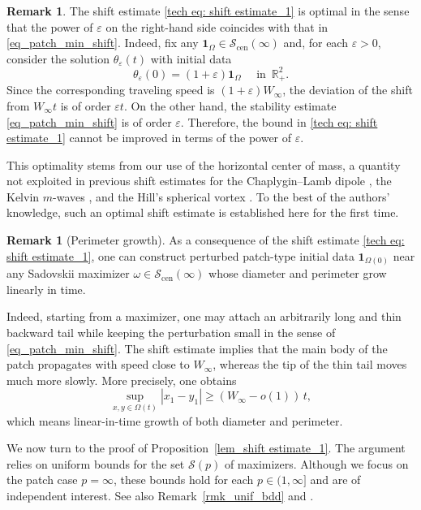 \documentclass[11pt]{amsart}
\theoremstyle{definition}
\theoremstyle{definition}
\newtheorem{remark}[theorem]{Remark}
\numberwithin{equation}{section}
\newcommand{\0}{\emptyset}
\newcommand{\veps}{\varepsilon}
\newcommand{\Omg}{\Omega}
\newcommand{\bbR}{\mathbb R}
\newcommand{\calS}{\mathcal S}
\newcommand{\bfone}{\mathbf1}
\newcommand{\ift}{\infty}
\begin{document}
			\begin{remark}\label{rmk: shift is optimal}
				The shift estimate \eqref{tech eq: shift estimate_1} is optimal in the sense that the power of $\veps$ on the right-hand side coincides with that in \eqref{eq_patch_min_shift}.
				Indeed, fix any $\bfone_\Omg\in\calS_{\mathrm{cen}}(\ift)$ and, for each $\veps>0$, consider the solution $\theta_\veps(t)$ with initial data 
				\[
				\theta_\veps(0)=(1+\veps)\bfone_\Omega \quad \textrm{ in }\, \bbR^2_+.
				\]
				Since the corresponding traveling speed is $(1+\veps)W_\ift$, the deviation of the shift from $W_{\infty}t$ is of order $\veps  t$.
				On the other hand, the stability estimate \eqref{eq_patch_min_shift} is of order $\varepsilon$.
				Therefore, the bound in \eqref{tech eq: shift estimate_1} cannot be improved in terms of the power of $\varepsilon$.
				
				This optimality stems from our use of the horizontal center of mass, a quantity not exploited in previous shift estimates for the Chaplygin--Lamb dipole \cite{CJ2022, JYZ}, the Kelvin $m$-waves \cite{CJ2022kelvin}, and the Hill's spherical vortex \cite{CJ2023}.
				To the best of the authors' knowledge, such an optimal shift estimate is established here for the first time. 
			\end{remark}
			
			\begin{remark}[Perimeter growth]\label{rmk: perimeter_growth}
				As a consequence of the shift estimate \eqref{tech eq: shift estimate_1}, one can construct perturbed patch-type initial data $\mathbf{1}_{\Omega(0)}$ near any Sadovskii maximizer $\omega\in\calS_{\mathrm{cen}}(\infty)$ whose diameter and perimeter grow linearly in time.
				
				Indeed, starting from a maximizer, one may attach an arbitrarily long and thin backward tail while keeping the perturbation small in the sense of \eqref{eq_patch_min_shift}.
				The shift estimate implies that the main body of the patch propagates with speed close to $W_\infty$, whereas the tip of the thin tail moves much more slowly.
				More precisely, one obtains
				\[
				\sup_{x,y\in\Omega(t)} |x_1-y_1|
				\ge (W_\infty - o(1))\,t,
				\]
				which means linear-in-time growth of both diameter and perimeter.
			\end{remark}
			
			
			
			We now turn to the proof of Proposition~\ref{lem_shift estimate_1}.
			The argument relies on uniform bounds for the set $\calS(p)$ of maximizers.
			Although we focus on the patch case $p=\infty$, these bounds hold for each $p\in(1,\infty]$ and are of independent interest.
			See also Remark~\ref{rmk_unif_bdd} and \cite[Lemma~4.6]{CJS2025}.
			
\end{document}
